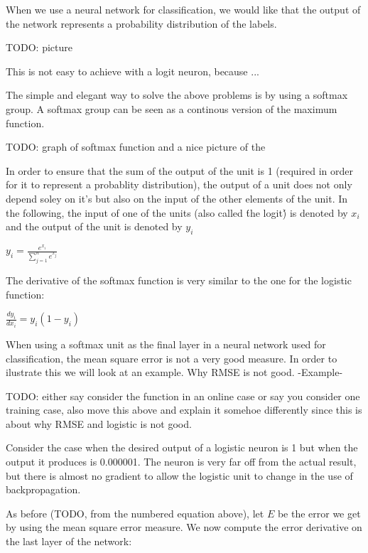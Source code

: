 \documentclass[11pt, fleqn, twoside]{article}
\begin{document}
  When we use a neural network for classification, we would like that the output of the network represents a probability distribution of the labels.


  TODO: picture

  This is not easy to achieve with a logit neuron, because ...

  The simple and elegant way to solve the above problems is by using a softmax group. A softmax group can be seen as a continous version of the maximum function.

  TODO: graph of softmax function and a nice picture of the

  In order to ensure that the sum of the output of the unit is 1 (required in order for it to represent a probablity distribution), the output of a unit does not only depend soley on it's but also on the input of the other elements of the unit.
  In the following, the input of one of the units (also called \'the logit\') is denoted by $x_i$ and the output of the unit is denoted by $y_i$

\begin{center} $y_i = \frac{e^{x_i}}{\sum\limits_{j=1}^n {e^{x_j}}}$ \end{center}

  The derivative of the softmax function is very similar to the one for the logistic function:

  \begin{center} $\frac{d {y_i}}{d {x_i}} = {y_i} (1-{y_i})$ \end{center}

  When using a softmax unit as the final layer in a neural network used for classification, the mean square error is not a very good measure.
  In order to ilustrate this we will look at an example.
    Why RMSE is not good.
    -Example-

  TODO: either say consider the function in an online case or say you consider one training case, also move this above and explain
  it somehoe differently since this is about why RMSE and logistic is not good.

  Consider the case when the desired output of a logistic neuron is 1 but when the output it produces is 0.000001. The neuron is very far off from the actual result, but there is almost no gradient to allow the logistic unit to change in the use of backpropagation.

  As before (TODO, from the numbered equation above), let $E$ be the error we get by using the mean square error measure.
  We now compute the error derivative on the last layer of the network:
\end{document}
